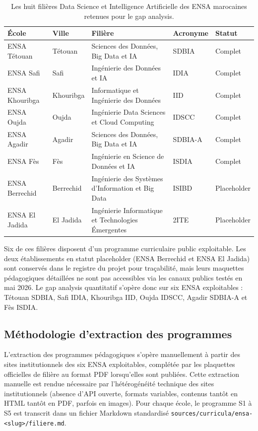 \documentclass[11pt,a4paper,openany]{report}
\begin{document}
\begin{table}[H]
  \centering
  \caption{Les huit fili\`eres Data Science et Intelligence Artificielle des ENSA marocaines retenues pour le gap analysis.}
  \label{tab:filieres-ensa}
  \small
  \begin{tabularx}{\textwidth}{l l L{4.5cm} l l}
    \toprule
    \textbf{\'Ecole} & \textbf{Ville} & \textbf{Fili\`ere} & \textbf{Acronyme} & \textbf{Statut} \\
    \midrule
    ENSA T\'etouan & T\'etouan & Sciences des Donn\'ees, Big Data et IA & SDBIA & Complet \\
    ENSA Safi & Safi & Ing\'enierie des Donn\'ees et IA & IDIA & Complet \\
    ENSA Khouribga & Khouribga & Informatique et Ing\'enierie des Donn\'ees & IID & Complet \\
    ENSA Oujda & Oujda & Ing\'enierie Data Sciences et Cloud Computing & IDSCC & Complet \\
    ENSA Agadir & Agadir & Sciences des Donn\'ees, Big Data et IA & SDBIA-A & Complet \\
    ENSA F\`es & F\`es & Ing\'enierie en Science de Donn\'ees et IA & ISDIA & Complet \\
    ENSA Berrechid & Berrechid & Ing\'enierie des Syst\`emes d'Information et Big Data & ISIBD & Placeholder \\
    ENSA El Jadida & El Jadida & Ing\'enierie Informatique et Technologies \'Emergentes & 2ITE & Placeholder \\
    \bottomrule
  \end{tabularx}
\end{table}

Six de ces fili\`eres disposent d'un programme curriculaire public exploitable. Les deux \'etablissements en statut placeholder (ENSA Berrechid et ENSA El Jadida) sont conserv\'es dans le registre du projet pour tra\c{c}abilit\'e, mais leurs maquettes p\'edagogiques d\'etaill\'ees ne sont pas accessibles via les canaux publics test\'es en mai 2026. Le gap analysis quantitatif s'op\`ere donc sur six ENSA exploitables : T\'etouan SDBIA, Safi IDIA, Khouribga IID, Oujda IDSCC, Agadir SDBIA-A et F\`es ISDIA.

\subsection{M\'ethodologie d'extraction des programmes}

L'extraction des programmes p\'edagogiques s'op\`ere manuellement \`a partir des sites institutionnels des six ENSA exploitables, compl\'et\'ee par les plaquettes officielles de fili\`ere au format PDF lorsqu'elles sont publi\'ees. Cette extraction manuelle est rendue n\'ecessaire par l'h\'et\'erog\'en\'eit\'e technique des sites institutionnels (absence d'API ouverte, formats variables, contenus tant\^ot en HTML tant\^ot en PDF, parfois en images). Pour chaque \'ecole, le programme S1 \`a S5 est transcrit dans un fichier Markdown standardis\'e \texttt{sources/curricula/ensa-<slug>/filiere.md}.
\end{document}
